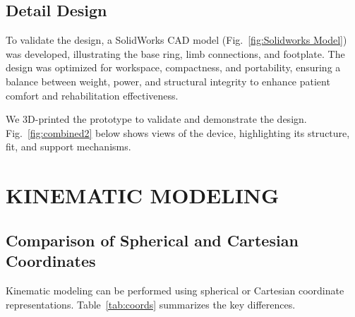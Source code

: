 \documentclass[letterpaper, 10 pt, conference]{ieeeconf}  %
\begin{document}
\subsection{Detail Design}
To validate the design, a SolidWorks CAD model (Fig.~\ref{fig:Solidworks Model}) was developed, illustrating the base ring, limb connections, and footplate. The design was optimized for workspace, compactness, and portability, ensuring a balance between weight, power, and structural integrity to enhance patient comfort and rehabilitation effectiveness.

We 3D-printed the prototype to validate and demonstrate the design. Fig.~\ref{fig:combined2} below shows views of the device, highlighting its structure, fit, and support mechanisms.

\section{KINEMATIC MODELING}

\subsection{Comparison of Spherical and Cartesian Coordinates}
Kinematic modeling can be performed using spherical or Cartesian coordinate representations. Table~\ref{tab:coords} summarizes the key differences.

\renewcommand{\arraystretch}{1.2} 
\end{document}
